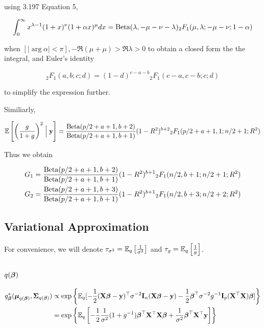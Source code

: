 \documentclass{amsart}[12pt]
\begin{document}
using \cite{Gradshteyn1988} 3.197 Equation 5,

\[
	\int_0^\infty x^{\lambda-1} (1+x)^\nu (1 + \alpha x)^{\mu} dx = \text{Beta}(\lambda, -\mu-\nu-\lambda) {}_2 F_1 (\mu, \lambda; -\mu-\nu; 1 - \alpha)
\]

when $[|\arg \alpha| < \pi], -\Re(\mu + \mu) > \Re \lambda > 0$ to obtain a closed form the the integral,  and
Euler's identity

\[
	{}_2 F_1(a, b; c; d) = (1 - d)^{c - a -  b} {}_2 F_1(c - a, c - b; c; d)
\]

to simplify the expression further.

Similiarly,

\[
	\mathbb{E}\left[ \left(\frac{g}{1 + g} \right)^2 \Bigm| {\bf y} \right] = \frac{\text{Beta}(p/2 + a + 1, b + 2)}{\text{Beta}(p /2 + a + 1, b + 1)} (1 - R^2)^{b+2} {}_2 F_1(p/2 + a + 1, 1; n/2 + 1; R^2)
\]

Thus we obtain

\begin{align*}
	G_1 & = \frac{\text{Beta}(p/2 + a + 1, b + 2)}{\text{Beta}(p /2 + a + 1, b + 1)} (1 - R^2)^{b+1} {}_2 F_1(n/2, b + 1; n/2 + 1; R^2) \\
	G_2 & = \frac{\text{Beta}(p/2 + a + 1, b + 3)}{\text{Beta}(p /2 + a + 1, b + 1)} (1 - R^2)^{b+1} {}_2 F_1(n/2, b + 3; n/2 + 2; R^2) 
\end{align*}


\subsection{Variational Approximation}

For convenience, we will denote $\tau_{\sigma^2} = \mathbb{E}_q \left[ \frac{1}{\sigma^2} \right]$ and $\tau_{g} =
\mathbb{E}_q \left[ \frac{1}{g} \right]$.

\subsection{$q({\boldsymbol \beta})$}

\begin{align*}
	q_{\boldsymbol \beta}^*({\boldsymbol \mu}_{q({\boldsymbol \beta})}, {\boldsymbol \Sigma}_{q({\boldsymbol \beta})}) & \propto \exp \left \{ \mathbb{E}_q[-\frac{1}{2} ({\bf X} {\boldsymbol \beta} - {\bf y})^\top \sigma^{-2} {\bf I}_n ({\bf X} {\boldsymbol \beta} - {\bf y}) - \frac{1}{2} {\boldsymbol \beta}^\top \sigma^{-2} g^{-1} {\bf I}_p ({\bf X}^\top {\bf X}) {\boldsymbol \beta}] \right \} \\
	                                                  & = \exp \left \{ \mathbb{E}_q \left[-\frac{1}{2} \frac{1}{\sigma^2} (1 + g^{-1}){\boldsymbol \beta}^\top {\bf X}^\top {\bf X} {\boldsymbol\beta} + \frac{1}{\sigma^2}{\boldsymbol \beta}^\top {\bf X}^\top {\bf y} \right] \right \}                    
\end{align*}
\end{document}
